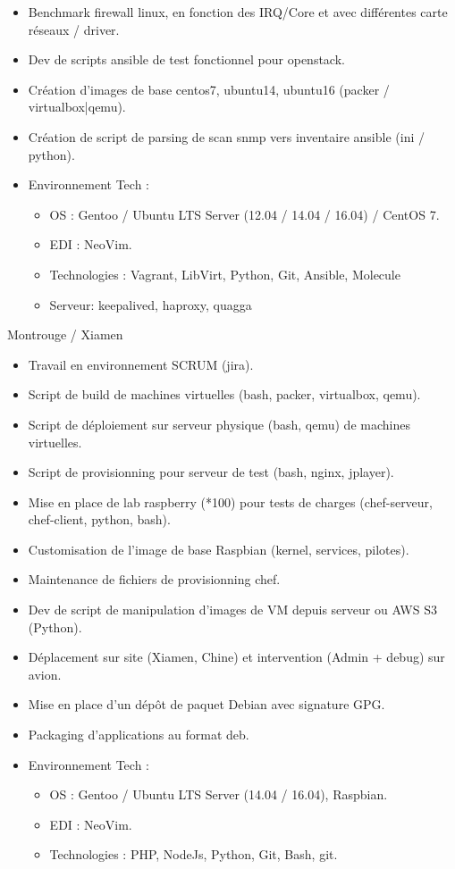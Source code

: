 \documentclass[10pt,a4paper,sans]{moderncv}
\begin{document}
{\begin{itemize}
    \item Benchmark firewall linux, en fonction des IRQ/Core et avec différentes carte réseaux / driver.
    \item Dev de scripts ansible de test fonctionnel pour openstack.
    \item Création d'images de base centos7, ubuntu14, ubuntu16 (packer / virtualbox|qemu).
    \item Création de script de parsing de scan snmp vers inventaire ansible (ini / python).
    \item Environnement Tech :
      \begin{itemize}%
        \item OS : Gentoo / Ubuntu LTS Server (12.04 / 14.04 / 16.04) / CentOS 7.
        \item EDI : NeoVim.
        \item Technologies : Vagrant, LibVirt, Python, Git, Ansible, Molecule
        \item Serveur: keepalived, haproxy, quagga
      \end{itemize}
  \end{itemize}}

{Montrouge / Xiamen}{
  \begin{itemize}%
    \item Travail en environnement SCRUM (jira).
    \item Script de build de machines virtuelles (bash, packer, virtualbox, qemu).
    \item Script de déploiement sur serveur physique (bash, qemu) de machines virtuelles.
    \item Script de provisionning pour serveur de test (bash, nginx, jplayer).
    \item Mise en place de lab raspberry (*100) pour tests de charges (chef-serveur, chef-client, python, bash).
    \item Customisation de l'image de base Raspbian (kernel, services, pilotes).
    \item Maintenance de fichiers de provisionning chef.
    \item Dev de script de manipulation d'images de VM depuis serveur ou AWS S3 (Python).
    \item Déplacement sur site (Xiamen, Chine) et intervention (Admin + debug) sur avion.
    \item Mise en place d'un dépôt de paquet Debian avec signature GPG.
    \item Packaging d'applications au format deb.
    \item Environnement Tech :
      \begin{itemize}%
        \item OS : Gentoo / Ubuntu LTS Server (14.04 / 16.04), Raspbian.
        \item EDI : NeoVim.
        \item Technologies : PHP, NodeJs, Python, Git, Bash, git.
      \end{itemize}
  \end{itemize}}
\end{document}
